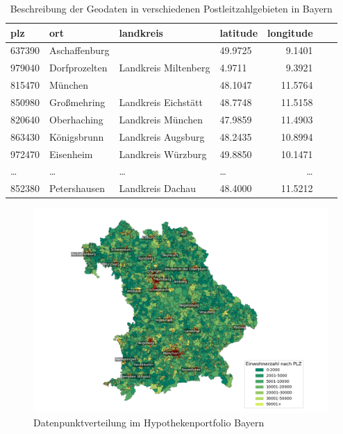 \begin{table}[htbp]
    \centering
    \small  %
    \caption{Beschreibung der Geodaten in verschiedenen Postleitzahlgebieten in Bayern}
    \label{tab:geodatenhyp}
    \begin{tabularx}{\textwidth}{lXlXrXr}
        \toprule
        \textbf{plz} & \textbf{ort} & \textbf{landkreis} & \textbf{latitude} & \textbf{longitude} \\
        \midrule
        637390 & Aschaffenburg & & 49.9725 & 9.1401 \\
        979040 & Dorfprozelten & Landkreis Miltenberg & 4.9711 & 9.3921 \\
        815470 & München & & 48.1047 & 11.5764 \\
        850980 & Großmehring & Landkreis Eichstätt & 48.7748 & 11.5158\\
        820640 & Oberhaching & Landkreis München & 47.9859 & 11.4903 \\
        863430 & Königsbrunn & Landkreis Augsburg & 48.2435 & 10.8994 \\
        972470 & Eisenheim & Landkreis Würzburg & 49.8850 & 10.1471 \\
        \dots & \dots & \dots & \dots & \dots \\
        852380 & Petershausen & Landkreis Dachau & 48.4000 & 11.5212\\
        \bottomrule
    \end{tabularx}
\end{table} 
\FloatBarrier

\begin{figure}[htbp]
    \centering
    \includegraphics[width=\textwidth]{figures/bayern_por_pop.png} 
    \caption{Datenpunktverteilung im Hypothekenportfolio Bayern}
    \label{fig:hypothekenportfolio}
\end{figure}
\FloatBarrier

